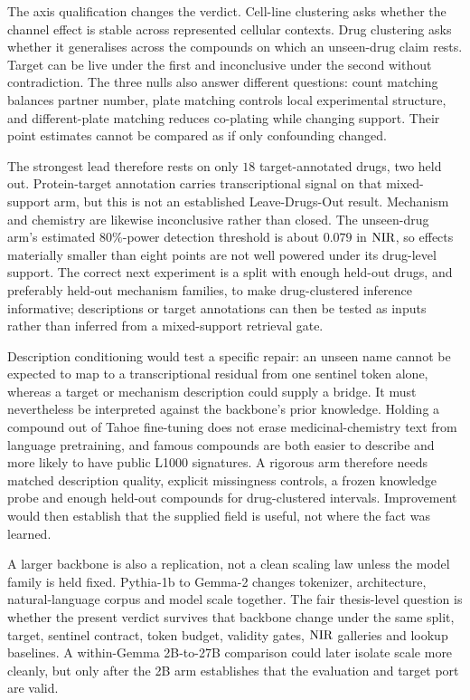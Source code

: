 The axis qualification changes the verdict. Cell-line clustering asks whether the channel effect is
stable across represented cellular contexts. Drug clustering asks whether it generalises across the
compounds on which an unseen-drug claim rests. Target can be live under the first and inconclusive
under the second without contradiction. The three nulls also answer different questions: count
matching balances partner number, plate matching controls local experimental structure, and
different-plate matching reduces co-plating while changing support. Their point estimates cannot be
compared as if only confounding changed.

The strongest lead therefore rests on only $18$ target-annotated drugs, two held out. Protein-target
annotation carries transcriptional signal on that mixed-support arm, but this is not an established
Leave-Drugs-Out result. Mechanism and chemistry are likewise inconclusive rather than closed. The
unseen-drug arm's estimated $80\%$-power detection threshold is about $0.079$ in $\textrm{NIR}$, so effects
materially smaller than eight points are not well powered under its drug-level support. The
correct next experiment is a split with enough held-out drugs, and preferably held-out mechanism
families, to make drug-clustered inference informative; descriptions or target annotations can then
be tested as inputs rather than inferred from a mixed-support retrieval gate.

Description conditioning would test a specific repair: an unseen name cannot be expected to map to
a transcriptional residual from one sentinel token alone, whereas a target or mechanism description
could supply a bridge. It must nevertheless be interpreted against the backbone's prior knowledge.
Holding a compound out of Tahoe fine-tuning does not erase medicinal-chemistry text from language
pretraining, and famous compounds are both easier to describe and more likely to have public L1000
signatures. A rigorous arm therefore needs matched description quality, explicit missingness
controls, a frozen knowledge probe and enough held-out compounds for drug-clustered intervals.
Improvement would then establish that the supplied field is useful, not where the fact was learned.

A larger backbone is also a replication, not a clean scaling law unless the model family is held
fixed. Pythia-1b to Gemma-2 changes tokenizer, architecture, natural-language corpus and model scale
together. The fair thesis-level question is whether the present verdict survives that backbone
change under the same split, target, sentinel contract, token budget, validity gates, $\textrm{NIR}$
galleries and lookup baselines. A within-Gemma 2B-to-27B comparison could later isolate scale more
cleanly, but only after the 2B arm establishes that the evaluation and target port are valid.

